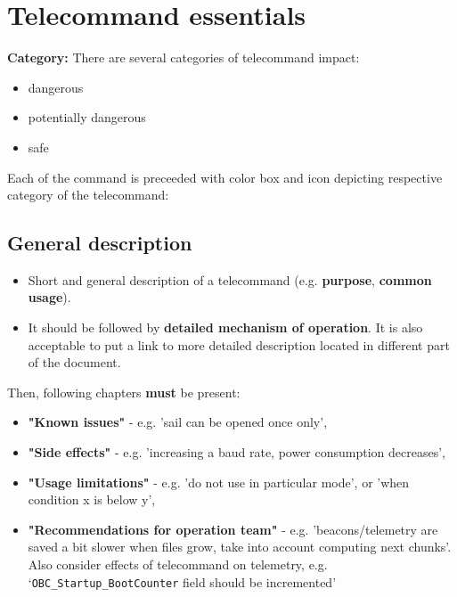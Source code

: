\section{Telecommand essentials}

\textbf{Category:} There are several categories of telecommand impact:
\begin{itemize}
    \item dangerous
    \item potentially dangerous
    \item safe
\end{itemize}

Each of the command is preceeded with color box and icon depicting respective category of the telecommand:
\vspace{1em}
\vspace{1em}
\vspace{1em}

\subsection{General description}
\begin{itemize}
    \item Short and general description of a telecommand (e.g. \textbf{purpose}, \textbf{common usage}).
    \item It should be followed by \textbf{detailed mechanism of operation}. It is also acceptable to put a link to more detailed description located in different part of the document.
\end{itemize}

Then, following chapters \textbf{must} be present:
\begin{itemize}
    \item \textbf{"Known issues"} - e.g. 'sail can be opened once only',
    \item \textbf{"Side effects"} - e.g. 'increasing a baud rate, power consumption decreases',
    \item \textbf{"Usage limitations"} - e.g. 'do not use in particular mode', or 'when condition x is below y',
    \item \textbf{"Recommendations for operation team"} - e.g. 'beacons/telemetry are saved a bit slower when files grow, take into account computing next chunks'. Also consider effects of telecommand on telemetry, e.g. `\texttt{OBC_Startup_BootCounter} field should be incremented'
\end{itemize}

